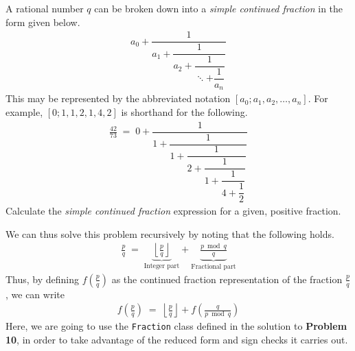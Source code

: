 

\problem A rational number $q$ can be broken down into a \textit{simple continued fraction} in the form given below.
\begin{align*}
	a_0 + \dfrac{1}{a_1 + \dfrac{1}{a_2 + \dfrac{1}{\ddots + \dfrac{1}{a_n}}}}
\end{align*}
This may be represented by the abbreviated notation $[a_0; a_1, a_2, \dots, a_n]$. For example, $[0; 1, 1, 2, 1, 4, 2]$ is shorthand for the following.
\begin{align*}
	\frac{42}{73} \;=\; 0 + \dfrac{1}{1 + \dfrac{1}{1 + \dfrac{1}{2 + \dfrac{1}{1 + \dfrac{1}{4 + \dfrac{1}{2}}}}}}
\end{align*}
Calculate the \textit{simple continued fraction} expression for a given, positive fraction.

\solution
We can thus solve this problem recursively by noting that the following holds.
\begin{align*}
	\frac{p}{q} \;=\;\!\!\! \underbrace{\left\lfloor \frac{p}{q} \right\rfloor}_{\text{Integer part}} 
			\!\!\!	+ \underbrace{\frac{p \bmod q}{q}}_{\text{Fractional part}}
\end{align*}
Thus, by defining $f(\frac{p}{q})$ as the continued fraction representation of the fraction $\frac{p}{q}$, we can write
\begin{align*}
	f \left( \frac{p}{q} \right) \;=\; \left\lfloor \frac{p}{q} \right\rfloor + f \left( \frac{q}{p \bmod q} \right)
\end{align*}
Here, we are going to use the \texttt{Fraction} class defined in the solution to \textbf{Problem 10}, in order to take advantage of the
reduced form and sign checks it carries out.

